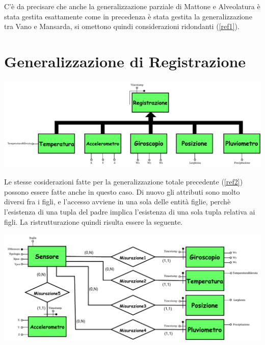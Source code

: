 \documentclass[12pt,a4paper]{report}
\begin{document}
                C'è da precisare che anche la generalizzazione parziale di Mattone e Alveolatura è stata gestita esattamente come in precedenza è stata gestita la generalizzazione tra Vano e Mansarda, si omettono quindi considerazioni ridondanti (\ref{ref1}).
                
                \section{Generalizzazione di Registrazione}
                \vspace*{1cm}
                \begin{center}
                    \includegraphics[scale=0.8]{genRegistrazione.pdf}
                \end{center}
                \vspace*{1cm}
                Le stesse cosiderazioni fatte per la generalizzazione totale precedente (\ref{ref2}) possono essere fatte anche in questo caso. Di nuovo gli attributi sono molto diversi fra i figli, e l'accesso avviene in una sola delle entità figlie, perchè l'esistenza di una tupla del padre implica l'esistenza di una sola tupla relativa ai figli. La ristrutturazione quindi risulta essere la seguente.
                \vspace*{1cm}
                \begin{center}
                    \includegraphics[scale=0.9]{genRegistrazioneTrad.pdf}
                \end{center}
                
\end{document}
